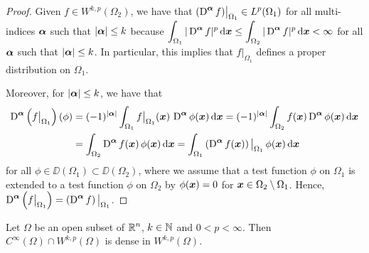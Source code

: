 \begin{proof}
Given $\displaystyle f \in W^{k,p}(\Omega_2)$, we have that
$\displaystyle (\operatorname{D}^{{\bm{\alpha}}} f)\big|_{\Omega_1} \in L^p(\Omega_1)$ for
all multi-indices ${\bm{\alpha}}$ such that $|{\bm{\alpha}}|\leq k$ because
$\displaystyle \int_{\Omega_1} |\operatorname{D}^{{\bm{\alpha}}} f|^p \,\mathrm{d}{{\bm{x}}} \leq 
\int_{\Omega_2} |\operatorname{D}^{{\bm{\alpha}}} f|^p \,\mathrm{d}{{\bm{x}}} < \infty$
for all ${\bm{\alpha}}$ such that $|{\bm{\alpha}}|\leq k$.  In
particular, this implies that 
$\displaystyle f\big|_{\Omega_1}$ defines a proper distribution on $\Omega_1$.

Moreover, for $|{\bm{\alpha}}| \leq k$, we have that
\begin{align*}
\operatorname{D}^{{\bm{\alpha}}} \left(f\big|_{\Omega_1}\right)(\phi)
&= (-1)^{|{\bm{\alpha}}|} \int_{\Omega_1} f\big|_{\Omega_1}({\bm{x}})
\,\operatorname{D}^{{\bm{\alpha}}}\phi({\bm{x}}) \,\mathrm{d}{{\bm{x}}}
= (-1)^{|{\bm{\alpha}}|} \int_{\Omega_2} f({\bm{x}})
\operatorname{D}^{{\bm{\alpha}}}\phi({\bm{x}}) \,\mathrm{d}{{\bm{x}}} \\
&= \int_{\Omega_2} \operatorname{D}^{{\bm{\alpha}}} f({\bm{x}}) \, \phi({\bm{x}}) \,\mathrm{d}{{\bm{x}}}
= \int_{\Omega_1} \left(\operatorname{D}^{{\bm{\alpha}}} f({\bm{x}})\right)\big|_{\Omega_1} \,
\phi({\bm{x}}) \,\mathrm{d}{{\bm{x}}}
\end{align*}
for all $\phi \in \DD(\Omega_1) \subset \DD(\Omega_2)$, where we
assume that a test function $\phi$ on $\Omega_1$ is extended to a test
function $\phi$ on $\Omega_2$ by
$\phi({\bm{x}}) = 0$ for ${\bm{x}} \in \Omega_2 \setminus \Omega_1$.  Hence,
$\displaystyle \operatorname{D}^{{\bm{\alpha}}} \left(f\big|_{\Omega_1}\right) =
\left( \operatorname{D}^{{\bm{\alpha}}} f \right)\big|_{\Omega_1}$.
\end{proof}

\begin{theorem} \label{sob_Cinfty_dense}
Let $\Omega$ be an open subset of $\displaystyle \mathbb{R}^n$, $k\in \mathbb{N}$
and $0<p<\infty$.
Then $\displaystyle C^\infty(\Omega) \cap W^{k,p}(\Omega)$ is dense in
$\displaystyle W^{k,p}(\Omega)$.
\end{theorem}

